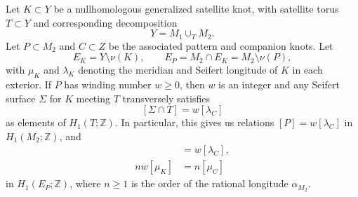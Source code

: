 \documentclass[10pt,a4paper]{amsart}
\newcommand{\Z}{\mathbb{Z}}
\begin{document}
\begin{lemma} \label{lem:winding-number-satellite}
Let $K \subset Y$ be a nullhomologous generalized satellite knot, with satellite torus $T \subset Y$ and corresponding decomposition \[Y = M_1 \cup_T M_2.\]  Let $P \subset M_2$ and $C \subset Z$ be the associated pattern and companion knots.  Let \[E_K = Y \setminus \nu(K), \qquad E_P = M_2\cap E_K = M_2 \setminus \nu(P),\] with $\mu_K$ and $\lambda_K$ denoting the meridian and Seifert longitude of $K$ in each exterior.
If $P$ has winding number $w \geq 0$, then $w$ is an integer and any Seifert surface $\Sigma$ for $K$ meeting $T$ transversely satisfies
\[ [\Sigma \cap T] = w[\lambda_C] \]
as elements of $H_1(T;\Z)$.  In particular, this gives us relations $[P] = w[\lambda_C]$ in $H_1(M_2;\Z)$, and
\begin{align*}
[\lambda_K] &= w[\lambda_C], \\
nw[\mu_K] &= n[\mu_C]
\end{align*}
in $H_1(E_P;\Z)$, where $n \geq 1$ is the order of the rational longitude $\alpha_{M_2}$.
\end{lemma}
\end{document}
